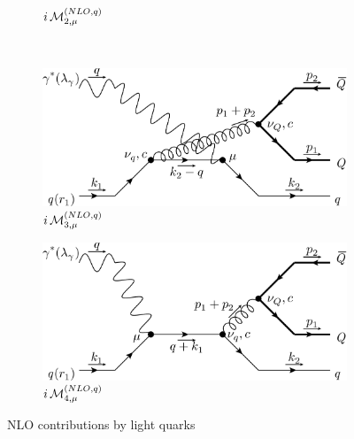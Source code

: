 \begin{figure}[ht!]
\begin{subfigure}[t]{.4\textwidth}
		\caption{$i\operatorname{\mathcal M}^{(NLO,q)}_{2,\mu}$}
	\end{subfigure}\\
	\begin{subfigure}[t]{.42\textwidth}
		\includegraphics[width=\textwidth]{pyfeyn/nlo-q-c}
		\caption{$i\operatorname{\mathcal M}^{(NLO,q)}_{3,\mu}$}
	\end{subfigure}\hspace{.1\textwidth}%
	\begin{subfigure}[t]{.42\textwidth}
		\includegraphics[width=\textwidth]{pyfeyn/nlo-q-d}
		\caption{$i\operatorname{\mathcal M}^{(NLO,q)}_{4,\mu}$}
	\end{subfigure}
	\caption{NLO contributions by light quarks}\label{fig:FeynNLOq}
\end{figure}

